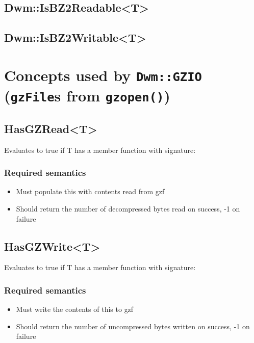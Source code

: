\begin{minipage}{\textwidth}
\subsection{\ttfamily Dwm::IsBZ2Readable<T>}\label{concept:DwmIsBZ2Readable}

\subsection{\ttfamily Dwm::IsBZ2Writable<T>}\label{concept:DwmIsBZ2Writable}
\end{minipage}

\begin{minipage}{\textwidth}
\section{Concepts used by \texttt{Dwm::GZIO} (\texttt{gzFile}s from \texttt{gzopen()})}
\hypertarget{concept:DwmHasGZRead}{\subsection{\ttfamily HasGZRead<T>}}
Evaluates to true if {\ttfamily T} has a member function with signature:


\subsubsection{Required semantics}
\begin{itemize}[noitemsep,nolistsep]
  \item Must populate {\ttfamily *this} with contents read from {\ttfamily gzf}
  \item Should return the number of decompressed bytes read on success, -1 on
    failure
\end{itemize}

\hypertarget{concept:DwmHasGZWrite}{\subsection{\ttfamily HasGZWrite<T>}}
Evaluates to true if {\ttfamily T} has a member function with signature:


\subsubsection{Required semantics}
\begin{itemize}[noitemsep,nolistsep]
\item Must write the contents of {\ttfamily *this} to {\ttfamily gzf}
\item Should return the number of uncompressed bytes written on success, -1
  on failure
\end{itemize}


\end{minipage}

